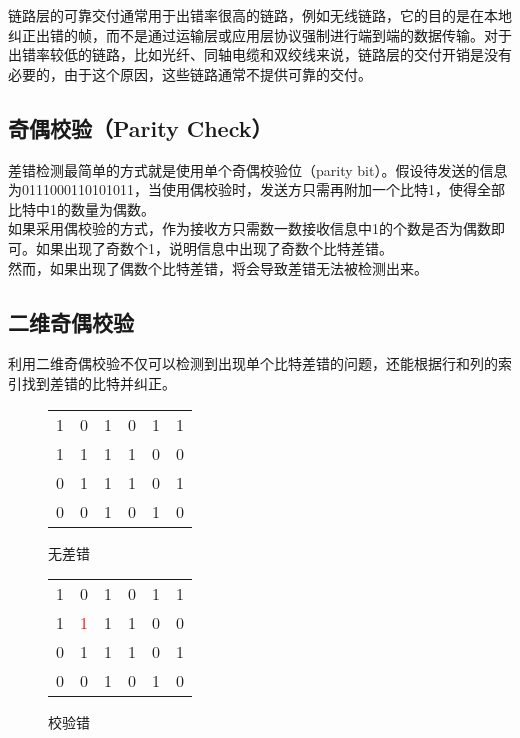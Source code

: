 链路层的可靠交付通常用于出错率很高的链路，例如无线链路，它的目的是在本地纠正出错的帧，而不是通过运输层或应用层协议强制进行端到端的数据传输。对于出错率较低的链路，比如光纤、同轴电缆和双绞线来说，链路层的交付开销是没有必要的，由于这个原因，这些链路通常不提供可靠的交付。\\

\subsection{奇偶校验（Parity Check）}

差错检测最简单的方式就是使用单个奇偶校验位（parity bit）。假设待发送的信息为0111000110101011，当使用偶校验时，发送方只需再附加一个比特1，使得全部比特中1的数量为偶数。\\

如果采用偶校验的方式，作为接收方只需数一数接收信息中1的个数是否为偶数即可。如果出现了奇数个1，说明信息中出现了奇数个比特差错。\\

然而，如果出现了偶数个比特差错，将会导致差错无法被检测出来。\\

\subsection{二维奇偶校验}

利用二维奇偶校验不仅可以检测到出现单个比特差错的问题，还能根据行和列的索引找到差错的比特并纠正。\\

\begin{figure}[H]
    \centering
    \begin{tabular}{ccccc|c}
        1 & 0 & 1 & 0 & 1 & 1 \\
        1 & 1 & 1 & 1 & 0 & 0 \\
        0 & 1 & 1 & 1 & 0 & 1 \\
        \hline
        0 & 0 & 1 & 0 & 1 & 0
    \end{tabular}
    \caption{无差错}
\end{figure}

\vspace{0.5cm}

\begin{figure}[H]
    \centering
    \begin{tabular}{ccccc|c}
        1 & 0                  & 1 & 0 & 1 & 1 \\
        1 & \textcolor{red}{1} & 1 & 1 & 0 & 0 \\
        0 & 1                  & 1 & 1 & 0 & 1 \\
        \hline
        0 & 0                  & 1 & 0 & 1 & 0
    \end{tabular}
    \caption{校验错}
\end{figure}

